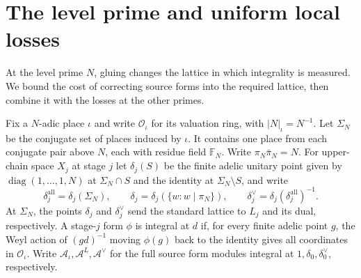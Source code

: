 \section{The level prime and uniform local losses}
\label{sec:a-level-prime}

At the level prime $N$, gluing changes the lattice in which integrality is measured. We bound the cost of correcting source forms into the required lattice, then combine it with the losses at the other primes.

Fix a $N$-adic place $\iota$ and write $\mathcal O_\iota$ for its valuation ring, with $|N|_\iota=N^{-1}$. Let $\Sigma_N$ be the conjugate set of places induced by $\iota$. It contains one place from each conjugate pair above $N$, each with residue field $\mathbb F_N$. Write $\pi_N\bar\pi_N=N$. For upper-chain space $X_j$ at stage $j$ let $\delta_j(S)$ be the finite adelic unitary point given by $\operatorname{diag}(1,\ldots,1,N)$ at $\Sigma_N\cap S$ and the identity at $\Sigma_N\setminus S$, and write
\[
 \delta_j^{\mathrm{all}}=\delta_j(\Sigma_N),\qquad
 \delta_j=\delta_j(\{w:w\mid\pi_N\}),\qquad
 \delta_j^\vee=\delta_j(\delta_j^{\mathrm{all}})^{-1}.
\]
At $\Sigma_N$, the points $\delta_j$ and $\delta_j^\vee$ send the standard lattice to $L_j$ and its dual, respectively. A stage-$j$ form $\phi$ is integral at $d$ if, for every finite adelic point $g$, the Weyl action of $(gd)^{-1}$ moving $\phi(g)$ back to the identity gives all coordinates in $\mathcal O_\iota$. Write $\mathcal A_\iota,\mathcal A^L,\mathcal A^\vee$ for the full source form modules integral at $1,\delta_0,\delta_0^\vee$, respectively.

